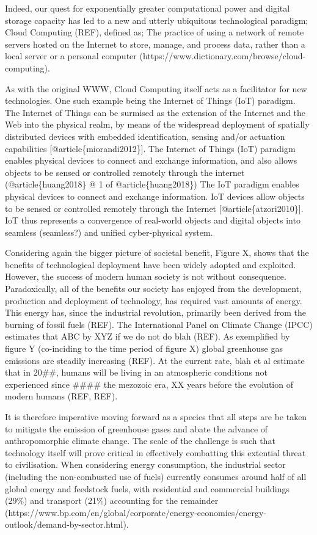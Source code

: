 \documentclass[11pt]{article}
\begin{document}
Indeed, our quest for exponentially greater computational power and
digital storage capacity has led to a new and utterly ubiquitous
technological paradigm; Cloud Computing (REF), defined as; The practice
of using a network of remote servers hosted on the Internet to store,
manage, and process data, rather than a local server or a personal
computer (https://www.dictionary.com/browse/cloud-computing).

As with the original WWW, Cloud Computing itself acts as a facilitator
for new technologies. One such example being the Internet of Things
(IoT) paradigm. The Internet of Things can be surmised as the extension
of the Internet and the Web into the physical realm, by means of the
widespread deployment of spatially distributed devices with embedded
identification, sensing and/or actuation capabilities
{[}@article\{miorandi2012\}{]}. The Internet of Things (IoT) paradigm
enables physical devices to connect and exchange information, and also
allows objects to be sensed or controlled remotely through the internet
(@article\{huang2018\} @ 1 of @article\{huang2018\}) The IoT paradigm
enables physical devices to connect and exchange information. IoT
devices allow objects to be sensed or controlled remotely through the
Internet {[}@article\{atzori2010\}{]}. IoT thus represents a convergence
of real-world objects and digital objects into seamless (seamless?) and
unified cyber-physical system.

Considering again the bigger picture of societal benefit, Figure X,
shows that the benefits of technological deployment have been widely
adopted and exploited. However, the success of modern human society is
not without consequence. Paradoxically, all of the benefits our society
has enjoyed from the development, production and deployment of
technology, has required vast amounts of energy. This energy has, since
the industrial revolution, primarily been derived from the burning of
fossil fuels (REF). The International Panel on Climate Change (IPCC)
estimates that ABC by XYZ if we do not do blah (REF). As exemplified by
figure Y (co-inciding to the time period of figure X) global greenhouse
gas emissions are steadily increasing (REF). At the current rate, blah
et al estimate that in 20\#\#, humans will be living in an atmospheric
conditions not experienced since \#\#\#\# the mezozoic era, XX years
before the evolution of modern humans (REF, REF).

It is therefore imperative moving forward as a species that all steps
are be taken to mitigate the emission of greenhouse gases and abate the
advance of anthropomorphic climate change. The scale of the challenge is
such that technology itself will prove critical in effectively
combatting this extential threat to civilisation. When considering
energy consumption, the industrial sector (including the non-combusted
use of fuels) currently consumes around half of all global energy and
feedstock fuels, with residential and commercial buildings (29\%) and
transport (21\%) accounting for the remainder
(https://www.bp.com/en/global/corporate/energy-economics/energy-outlook/demand-by-sector.html).
\end{document}
